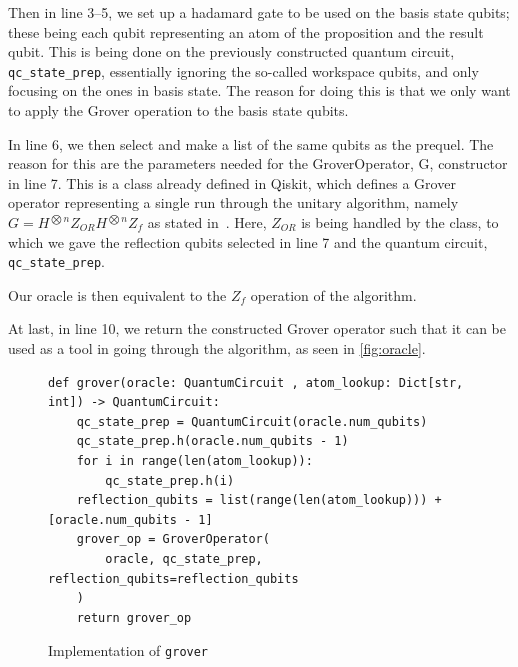 Then in line 3--5, we set up a hadamard gate to be used on the basis state qubits; these being each qubit representing an atom of the proposition and the result qubit.
This is being done on the previously constructed quantum circuit, \texttt{qc\_state\_prep}, essentially ignoring the so-called workspace qubits, and only focusing on the ones in basis state.
The reason for doing this is that we only want to apply the Grover operation to the basis state qubits.

In line 6, we then select and make a list of the same qubits as the prequel.
The reason for this are the parameters needed for the GroverOperator, G, constructor in line 7.
This is a class already defined in Qiskit, which defines a Grover operator representing a single run through the unitary algorithm, namely $G=H^{\bigotimes n}Z_{OR}H^{\bigotimes n}Z_f$ as stated in~\cite{Grover}.
Here, $Z_{OR}$ is being handled by the class, to which we gave the reflection qubits selected in line 7 and the quantum circuit, \texttt{qc\_state\_prep}.

Our oracle is then equivalent to the $Z_f$ operation of the algorithm.

At last, in line 10, we return the constructed Grover operator such that it can be used as a tool in going through the algorithm, as seen in \autoref{fig:oracle}.

\begin{figure}
\centering
\begin{verbatim}
def grover(oracle: QuantumCircuit , atom_lookup: Dict[str, int]) -> QuantumCircuit:
    qc_state_prep = QuantumCircuit(oracle.num_qubits)
    qc_state_prep.h(oracle.num_qubits - 1)
    for i in range(len(atom_lookup)):
        qc_state_prep.h(i)
    reflection_qubits = list(range(len(atom_lookup))) + [oracle.num_qubits - 1]
    grover_op = GroverOperator(
        oracle, qc_state_prep, reflection_qubits=reflection_qubits
    )
    return grover_op
\end{verbatim}
\caption{Implementation of \texttt{grover} }
\label{fig:grover}
\end{figure}



